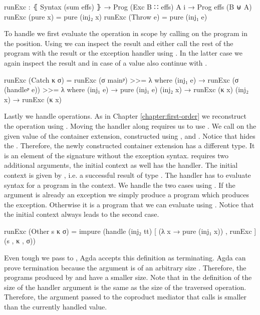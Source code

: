 \begin{code}
runExc : ⦃ Syntax (sum effs) ⦄ → Prog (Exc B ∷ effs) A {i} → Prog effs (B ⊎ A)
runExc (pure x)     = pure (inj₂ x)
runExc (Throw e)    = pure (inj₁ e)
\end{code}
To handle  we first evaluate the operation in
scope by calling  on the program in the
 position.
Using \AgdaFunction{>>=} we can inspect the result and either call the rest of
the program  with the result or the exception handler using
.
In the latter case we again inspect the result and in case of a value also
continue with .
\begin{code}
runExc (Catch κ σ)  = runExc (σ mainᵖ) >>= λ where
  (inj₁ e) → runExc (σ (handleᵖ e)) >>= λ where
    (inj₁ e) → pure (inj₁ e)
    (inj₂ x) → runExc (κ x)
  (inj₂ x) → runExc (κ x)
\end{code}
Lastly we handle  operations.
As in Chapter \ref{chapter:first-order} we reconstruct the operation using
.
Moving the handler along requires us to use .
We call  on the given value of the container extension,
constructed using ,  and .
Notice that  hides the
.
Therefore, the newly constructed container extension has a different type.
It is an element of the signature without the exception syntax.
 requires two additional arguments, the initial context as
well has the handler.
The initial context is given by
\AgdaSpace{}, i.e. a
successful result of type .
The handler has to evaluate  syntax for a program in the
context.
We handle the two cases using \AgdaFunction{[\_,\_]}.
If the argument is already an exception we simply produce a
 program which produces the exception.
Otherwise it is a program that we can evaluate using .
Notice that the initial context always leads to the second case.
\begin{code}
runExc (Other s κ σ) = impure (handle (inj₂ tt) [ (λ x → pure (inj₁ x)) , runExc ] (s , κ , σ))
\end{code}
Even tough we pass  to , Agda accepts this
definition as terminating.
Agda can prove termination because the argument is of an arbitrary size
.
Therefore, the programs produced by  and  have a
smaller size.
Note that in the definition of  the size of the handler
argument is the same as the size of the traversed operation.
Therefore, the argument passed to the coproduct mediator that calls
 is smaller than the currently handled value.

